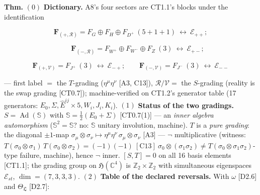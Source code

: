 \begin{theorem}\label{tag:CT1-11a}
\textbf{Thm.} $(0)$ \textbf{Dictionary.} A8's four sectors are CT1.1's blocks under the identification

\[
\mathbf F_{(+,\mathcal R)}=F_G\oplus F_H\oplus F_{D^+}\ (5{+}1{+}1)\ \leftrightarrow\ \mathcal E_{++};
\]

\[
\qquad \mathbf F_{(-,\mathcal R)}=F_{W^+}\oplus F_{W^-}\oplus F_Z\ (3)\ \leftrightarrow\ \mathcal E_{+-};
\]

\[
\mathbf F_{(+,\mathcal V)}=F_{J^+}\ (3)\ \leftrightarrow\ \mathcal E_{-+};\qquad
\mathbf F_{(-,\mathcal V)}=F_{J^-}\ (3)\ \leftrightarrow\ \mathcal E_{--}
\]

— first label $=$ the $T$-grading ($\eta^\mu\eta^\nu$ [A3, C13]), $\mathcal R/\mathcal V=$ the $S$-grading (reality is the swap grading [CT0.7]); machine-verified on CT1.2's generator table (17 generators: $E_0,\Sigma,\hat E^{ij}{\times}5,W_i,J_i,K_i$). $(1)$ \textbf{Status of the two gradings.} $S=\operatorname{Ad}(\mathbb S)$ with $\mathbb S=\tfrac12(E_0+\Sigma)$ [CT0.7(1)] — an \textit{inner algebra automorphism} ($\mathbb S^2=\mathbb S$? no: $\mathbb S$ unitary involution, machine). $T$ is a \textit{pure grading}: the diagonal $\pm1$-map $\sigma_\mu\otimes\sigma_\nu\mapsto\eta^\mu\eta^\nu\,\sigma_\mu\otimes\sigma_\nu$ [A3] — $\neg$ multiplicative (witness: $T(\sigma_0\otimes\sigma_1)\,T(\sigma_0\otimes\sigma_2)=(-1)(-1)\ [\mathrm{C13}]\ \sigma_0\otimes(\sigma_1\sigma_2)\ne T(\sigma_0\otimes\sigma_1\sigma_2)$-type failure, machine), hence $\neg$ inner. $[S,T]=0$ on all 16 basis elements [CT1.1]; the grading group on $\mathfrak H(\mathbb C^4)$ is $\mathbb Z_2\times\mathbb Z_2$ with simultaneous eigenspaces $\mathcal E_{st}$, $\dim=(7,3,3,3)$. $(2)$ \textbf{Table of the declared reversals.} With $\omega$ [D2.6] and $\Theta_{\mathfrak L}$ [D2.7]:


\end{theorem}
